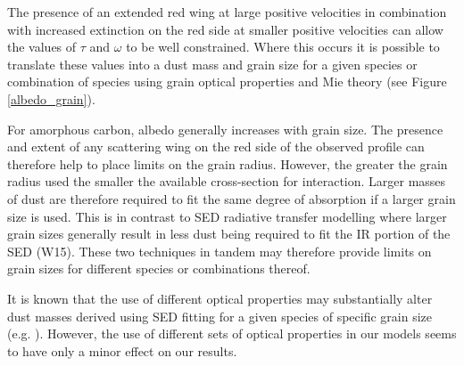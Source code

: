 \documentclass[useAMS,usenatbib,usegraphicx]{mnras}
\begin{document}

The presence of an extended red wing at large positive velocities in 
combination with increased extinction on the red side at smaller positive 
velocities can allow the values of $\tau$ and $\omega$ to be well 
constrained.  Where this occurs it is possible to translate these values into a 
dust mass and grain size for a given species or combination of 
species using grain optical properties and Mie theory (see Figure 
\ref{albedo_grain}).  


For amorphous carbon, albedo generally increases with grain size.  The presence and extent of any scattering wing on the red side of the observed profile can therefore help to place limits on the grain radius.  However, the greater the grain radius used the smaller the available cross-section for interaction.  Larger masses of dust 
are therefore required to fit the same degree of absorption if a larger 
grain size is used.  This is in contrast to SED radiative transfer 
modelling where larger grain sizes generally result in less dust being 
required to fit the IR portion of the SED (W15).  These two techniques in 
tandem may therefore provide limits on grain sizes for different 
species or combinations thereof.

It is known that the use of different 
optical properties may substantially alter dust masses derived using SED fitting for a given species of specific grain size (e.g. \citet{Owen2015}).  However, the use of different sets of optical properties in our models seems to have only a minor effect on our results.
\end{document}

